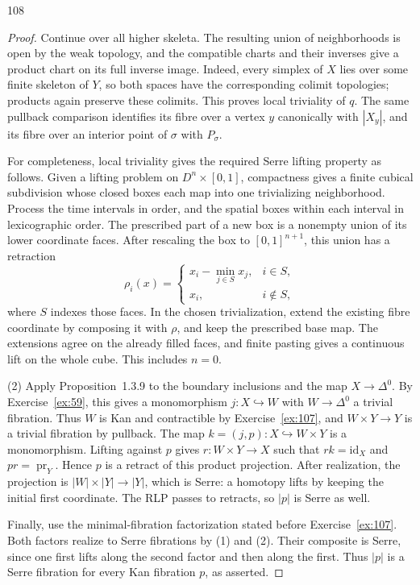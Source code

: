 \begin{exercise}{108}
\begin{proof}
Continue over all higher skeleta. The resulting union of neighborhoods
is open by the weak topology, and the compatible charts and their inverses
give a product chart on its full inverse image.
Indeed, every simplex of $X$ lies over some finite skeleton of $Y$,
so both spaces have the corresponding colimit topologies; products
again preserve these colimits.
This proves local triviality of $q$.
The same pullback comparison identifies its fibre over a vertex $y$
canonically with $|X_y|$, and its fibre over an interior point of
$\sigma$ with $P_\sigma$.

For completeness, local triviality gives the required Serre lifting
property as follows. Given a lifting problem on $D^n\times[0,1]$,
compactness gives a finite cubical subdivision whose closed boxes
each map into one trivializing neighborhood.
Process the time intervals in order, and the spatial boxes within
each interval in lexicographic order.
The prescribed part of a new box is a nonempty union of its lower
coordinate faces. After rescaling the box to $[0,1]^{n+1}$, this union
has a retraction
\[
 \rho_i(x)=
 \begin{cases}
  x_i-\min_{j\in S}x_j,&i\in S,\\
  x_i,&i\notin S,
 \end{cases}
\]
where $S$ indexes those faces.
In the chosen trivialization, extend the existing fibre coordinate
by composing it with $\rho$, and keep the prescribed base map.
The extensions agree on the already filled faces, and finite pasting
gives a continuous lift on the whole cube. This includes $n=0$.

(2) Apply Proposition~1.3.9 to the boundary inclusions and the map
$X\to\Delta^0$. By Exercise~\ref{ex:59}, this gives a monomorphism
$j\colon X\hookrightarrow W$ with $W\to\Delta^0$ a trivial fibration.
Thus $W$ is Kan and contractible by Exercise~\ref{ex:107}, and
$W\times Y\to Y$ is a trivial fibration by pullback.
The map $k=(j,p)\colon X\hookrightarrow W\times Y$ is a monomorphism.
Lifting against $p$ gives $r\colon W\times Y\to X$ such that
$rk=\mathrm{id}_X$ and $pr=\operatorname{pr}_Y$.
Hence $p$ is a retract of this product projection.
After realization, the projection is $|W|\times|Y|\to|Y|$,
which is Serre: a homotopy lifts by keeping the initial first coordinate.
The RLP passes to retracts, so $|p|$ is Serre as well.

Finally, use the minimal-fibration factorization stated before
Exercise~\ref{ex:107}. Both factors realize to Serre fibrations by
(1) and (2). Their composite is Serre, since one first lifts along
the second factor and then along the first. Thus $|p|$ is a Serre
fibration for every Kan fibration $p$, as asserted.
\end{proof}
\end{exercise}
